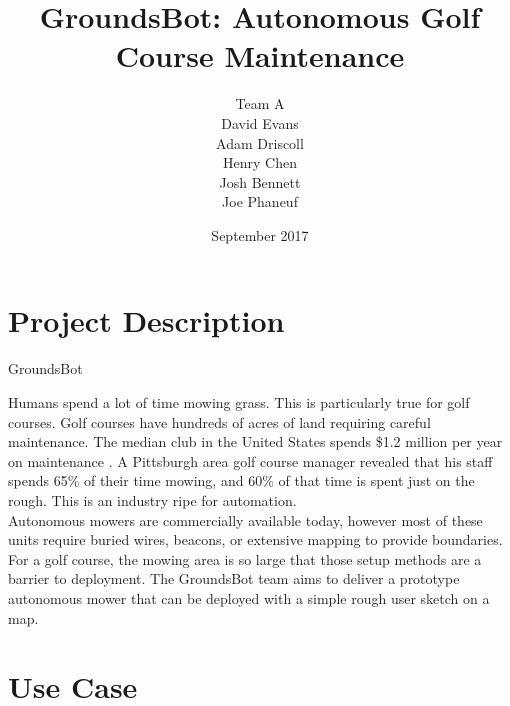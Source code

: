 \documentclass[12pt]{extarticle}
\begin{document}


\title{GroundsBot: Autonomous Golf Course Maintenance}
\date{September 2017}
\author{Team A        \\ David Evans \\
        Adam Driscoll \\ Henry Chen  \\
        Josh Bennett  \\ Joe Phaneuf \\ }

\maketitle
\def\svgwidth{\columnwidth}

\newpage

\tableofcontents
\newpage

\newpage
\section{Project Description}

\begin{center}
GroundsBot \\
\end{center}

Humans spend a lot of time mowing grass. This is particularly true for golf courses. Golf courses have hundreds of acres of land requiring careful maintenance.  The median club in the United States spends \$1.2 million per year on maintenance \cite{clubbenchmarking}. A Pittsburgh area golf course manager revealed that his staff spends 65\% of their time mowing, and 60\% of that time is spent just on the rough. This is an industry ripe for automation.
\\

Autonomous mowers are commercially available today, however most of these units require buried wires, beacons, or extensive mapping to provide boundaries. For a golf course, the mowing area is so large that those setup methods are a barrier to deployment. The GroundsBot team aims to deliver a prototype autonomous mower that can be deployed with a simple rough user sketch on a map.

\newpage
\section{Use Case}
\end{document}
